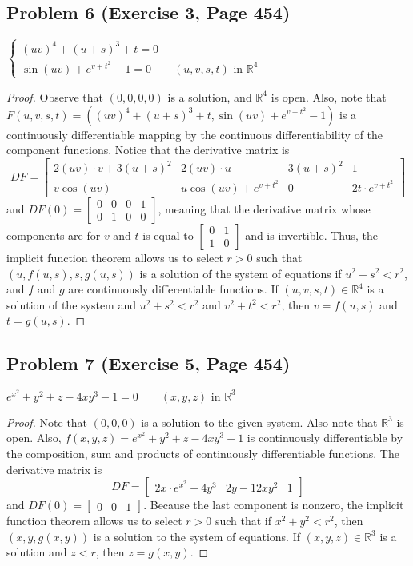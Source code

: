 \documentclass{article}
\begin{document}
\subsection*{Problem 6 (Exercise 3, Page 454)}
$\begin{cases} (uv)^4 + (u + s)^3 + t = 0 \\ \sin{(uv)} + e^{v+t^2} - 1 = 0 \qquad \text{$(u, v, s, t)$ in $\mathbb{R}^4$}\end{cases}$
\begin{proof}
Observe that $(0, 0, 0, 0)$ is a solution, and $\mathbb{R}^4$ is open. Also, note that $F(u, v, s, t) = ((uv)^4 + (u + s)^3 + t, \sin{(uv)} + e^{v+t^2} - 1)$ is a continuously differentiable mapping by the continuous differentiability of the component functions. Notice that the derivative matrix is 
\[ DF = \begin{bmatrix} 2(uv) \cdot v + 3(u+s)^2 & 2(uv) \cdot u & 3(u+s)^2 & 1 \\
v\cos(uv) & u\cos(uv) + e^{v+t^2} & 0 & 2t \cdot e^{v+t^2} 
\end{bmatrix}\]
and $DF(0) = \begin{bmatrix} 0 & 0 & 0 & 1 \\ 0 & 1 & 0 & 0 \end{bmatrix}$, meaning that the derivative matrix whose components are for $v$ and $t$ is equal to $\begin{bmatrix} 0 & 1 \\ 1 & 0 \end{bmatrix}$ and is invertible. Thus, the implicit function theorem allows us to select $r>0$ such that $(u, f(u, s), s, g(u, s))$ is a solution of the system of equations if $u^2 + s^2 < r^2$, and $f$ and $g$ are continuously differentiable functions. If $(u, v, s, t) \in \mathbb{R}^4$ is a solution of the system and $u^2 + s^2 < r^2$ and $v^2 + t^2 < r^2$, then $v = f(u, s)$ and $t = g(u, s)$.
\end{proof}

\subsection*{Problem 7 (Exercise 5, Page 454)}
$e^{x^2} + y^2 + z - 4xy^3 - 1 = 0 \qquad \text{$(x, y, z)$ in $\mathbb{R}^3$}$
\begin{proof}
Note that $(0, 0, 0)$ is a solution to the given system. Also note that $\mathbb{R}^3$ is open. Also, $f(x, y, z) = e^{x^2} + y^2 + z - 4xy^3 - 1$ is continuously differentiable by the composition, sum and products of continuously differentiable functions. The derivative matrix is 
\[ DF = \begin{bmatrix} 2x \cdot e^{x^2} - 4y^3 & 2y-12xy^2 & 1\end{bmatrix}\]
and $DF(0) = \begin{bmatrix} 0 & 0 & 1\end{bmatrix}$. Because the last component is nonzero, the implicit function theorem allows us to select $r>0$ such that if $x^2 + y^2 < r^2$, then $(x, y, g(x, y))$ is a solution to the system of equations. If $(x, y, z) \in \mathbb{R}^3$ is a solution and $z < r$, then $z = g(x, y)$.
\end{proof}
\end{document}

